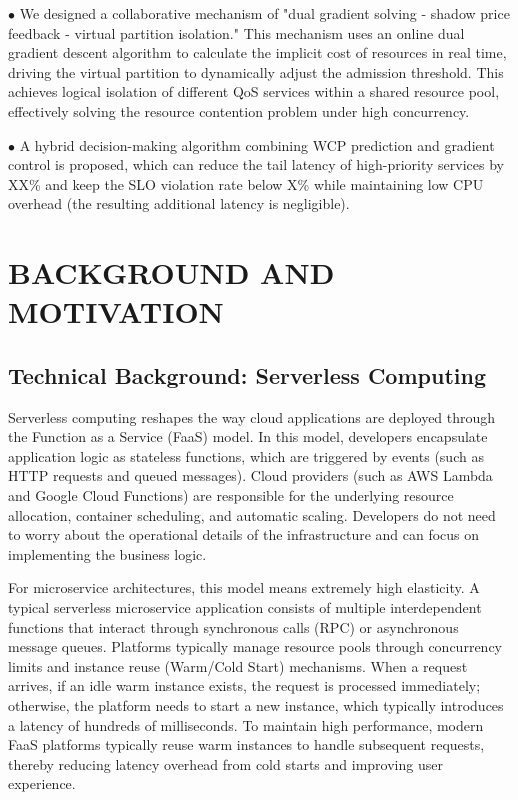 \documentclass[journal]{IEEEtran}
\begin{document}
$\bullet$ We designed a collaborative mechanism of "dual gradient solving - shadow price feedback - virtual partition isolation." This mechanism uses an online dual gradient descent algorithm to calculate the implicit cost of resources in real time, driving the virtual partition to dynamically adjust the admission threshold. This achieves logical isolation of different QoS services within a shared resource pool, effectively solving the resource contention problem under high concurrency.

$\bullet$ A hybrid decision-making algorithm combining WCP prediction and gradient control is proposed, which can reduce the tail latency of high-priority services by XX\% and keep the SLO violation rate below X\% while maintaining low CPU overhead (the resulting additional latency is negligible).

\section{BACKGROUND AND MOTIVATION}
\subsection{Technical Background: Serverless Computing}
Serverless computing reshapes the way cloud applications are deployed through the Function as a Service (FaaS) model. In this model, developers encapsulate application logic as stateless functions, which are triggered by events (such as HTTP requests and queued messages). Cloud providers (such as AWS Lambda and Google Cloud Functions) are responsible for the underlying resource allocation, container scheduling, and automatic scaling. Developers do not need to worry about the operational details of the infrastructure and can focus on implementing the business logic.

For microservice architectures, this model means extremely high elasticity. A typical serverless microservice application consists of multiple interdependent functions that interact through synchronous calls (RPC) or asynchronous message queues. Platforms typically manage resource pools through concurrency limits and instance reuse (Warm/Cold Start) mechanisms. When a request arrives, if an idle warm instance exists, the request is processed immediately; otherwise, the platform needs to start a new instance, which typically introduces a latency of hundreds of milliseconds. To maintain high performance, modern FaaS platforms typically reuse warm instances to handle subsequent requests, thereby reducing latency overhead from cold starts and improving user experience.
\end{document}

